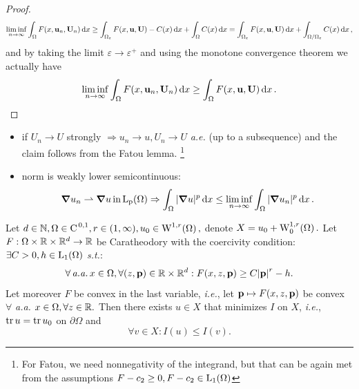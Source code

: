 \documentclass{article}
\begin{document}
\begin{proof}
	\[
		\liminf_{n\to \infty}\int_{\Omega}F\qty(x, \vb{u}_n, \vb{U}_n)\dd{x}\geq \int_{\Omega_{\varepsilon}}F\qty(x, \vb{u}, \vb{U})- C(x)\dd{x} + \int_{\Omega}C(x)\dd{x} = \int_{\Omega_{\varepsilon}}F\qty(x, \vb{u}, \vb{U})\dd{x} + \int_{\Omega / \Omega_{\varepsilon}}C(x)\dd{x},
	\]
	and by taking the limit $\varepsilon \to \varepsilon^+$ and using the monotone convergence theorem we actually have
	\[
		\liminf_{n \to \infty}\int_{\Omega}F\qty(x, \vb{u}_n, \vb{U}_n)\dd{x} \geq \int_{\Omega}F\qty(x, \vb{u}, \vb{U})\dd{x}.
	\]

\end{proof}
\begin{remark}
	\begin{itemize}
		\item if $U_n \to U$ strongly $\Rightarrow u_n \to u, U_n \to U$ \textit{a.e.} (up to a subsequence) and the claim follows from the Fatou lemma. \footnote{For Fatou, we need nonnegativity of the integrand, but that can be again met from the assumptions $F-c_2 \geq 0, F-c_2 \in \LpSet[1]{\Omega}$}
		\item norm is weakly lower semicontinuous:
			\[
				\grad u_n \rightharpoonup \grad u \, \text{in} \, \LpSet{\Omega} \Rightarrow \int_{\Omega}|\grad u|^p\dd{x} \leq \liminf_{n \to \infty} \int_{\Omega}|\grad u_n|^p\dd{x}.
			\]
	\end{itemize}
\end{remark}

\begin{theorem}
    Let $d \in \N, \Omega \in \Ckl{0}{1}, r \in (1, \infty), u_0 \in \WkpSet[1][r]{\Omega},$ denote $X = u_0 + \WkpzeroSet[1][r]{\Omega}.$ Let $F:\Omega \times {\mathbb R} \times {\mathbb R}^{d} \to {\mathbb R}$ be Caratheodory with the coercivity condition: $\exists C > 0, h \in \LpSet[1]{\Omega}$ \textit{s.t.}:
    \[
	    \forall \, \text{\textit{a.a.}} \, x \in \Omega, \forall \qty(z, \vb{p}) \in {\mathbb R} \times {\mathbb R}^{d}: F\qty(x,z,\vb{p}) \geq C\abs{\vb{p}}^r - h.
    \]
    Let moreover $F$ be convex in the last variable, \textit{i.e.}, let $\vb{p} \mapsto F\qty(x, z, \vb{p})$ be convex $\forall$ \textit{a.a.} $x\in \Omega, \forall z \in {\mathbb R}.$ Then there exists $u \in X$ that minimizes $I$ on $X$, \textit{i.e.}, $\trace u = \trace u_0$ on $\partial \Omega$ and
    \[
	    \forall v \in X: I(u) \leq I(v).
    \]
\end{theorem}
\end{document}
